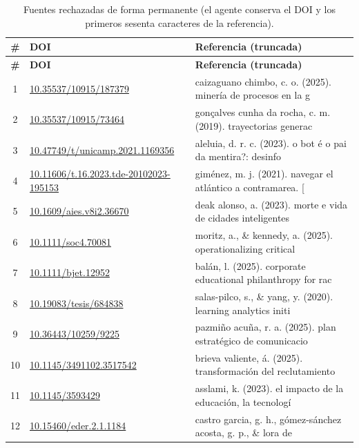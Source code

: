 {\footnotesize
\begin{longtable}{|c|p{4.0cm}|p{8.2cm}|}
\caption{Fuentes rechazadas de forma permanente (el agente conserva el DOI y los primeros sesenta caracteres de la referencia).}\label{tab:rechazadas}\\
\hline
\rowcolor{bgCotejo}
\textbf{\#} & \textbf{DOI} & \textbf{Referencia (truncada)} \\
\hline
\endfirsthead
\hline
\rowcolor{bgCotejo}
\textbf{\#} & \textbf{DOI} & \textbf{Referencia (truncada)} \\
\hline
\endhead
1 & {\scriptsize \url{10.35537/10915/187379}} & {\small caizaguano chimbo, c. o. (2025). minería de procesos en la g} \\
\hline
2 & {\scriptsize \url{10.35537/10915/73464}} & {\small gonçalves cunha da rocha, c. m. (2019). trayectorias generac} \\
\hline
3 & {\scriptsize \url{10.47749/t/unicamp.2021.1169356}} & {\small aleluia, d. r. c. (2023). o bot é o pai da mentira?: desinfo} \\
\hline
4 & {\scriptsize \url{10.11606/t.16.2023.tde-20102023-195153}} & {\small giménez, m. j. (2021). navegar el atlántico a contramarea. [} \\
\hline
5 & {\scriptsize \url{10.1609/aies.v8i2.36670}} & {\small deak alonso, a. (2023). morte e vida de cidades inteligentes} \\
\hline
6 & {\scriptsize \url{10.1111/soc4.70081}} & {\small moritz, a., \& kennedy, a. (2025). operationalizing critical } \\
\hline
7 & {\scriptsize \url{10.1111/bjet.12952}} & {\small balán, l. (2025). corporate educational philanthropy for rac} \\
\hline
8 & {\scriptsize \url{10.19083/tesis/684838}} & {\small salas-pilco, s., \& yang, y. (2020). learning analytics initi} \\
\hline
9 & {\scriptsize \url{10.36443/10259/9225}} & {\small pazmiño acuña, r. a. (2025). plan estratégico de comunicacio} \\
\hline
10 & {\scriptsize \url{10.1145/3491102.3517542}} & {\small brieva valiente, á. (2025). transformación del reclutamiento} \\
\hline
11 & {\scriptsize \url{10.1145/3593429}} & {\small asslami, k. (2023). el impacto de la educación, la tecnologí} \\
\hline
12 & {\scriptsize \url{10.15460/eder.2.1.1184}} & {\small castro garcia, g. h., gómez-sánchez acosta, g. p., \& lora de} \\

\end{longtable}}
